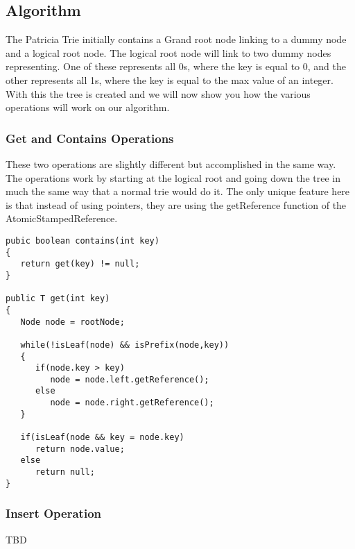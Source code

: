 \documentclass[conference]{IEEEtran}
\begin{document}
\subsection{Algorithm}
The Patricia Trie initially contains a Grand root node linking to a dummy node and a logical root node. The logical root node will link to two dummy nodes representing. One of these represents all 0s, where the key is equal to 0, and the other represents all 1s, where the key is equal to the max value of an integer. With this the tree is created and we will now show you how the various operations will work on our algorithm.

\subsubsection{Get and Contains Operations}
These two operations are slightly different but accomplished in the same way. The operations work by starting at the logical root and going down the tree in much the same way that a normal trie would do it. The only unique feature here is that instead of using pointers, they are using the getReference function of the AtomicStampedReference.
\begin{lstlisting}[frame=lines]
pubic boolean contains(int key)
{
   return get(key) != null;
}

public T get(int key)
{
   Node node = rootNode;

   while(!isLeaf(node) && isPrefix(node,key))
   {
      if(node.key > key)
         node = node.left.getReference();
      else
         node = node.right.getReference();
   }

   if(isLeaf(node && key = node.key)
      return node.value;
   else
      return null;
}
\end{lstlisting}

\subsubsection{Insert Operation}
TBD
\end{document}
